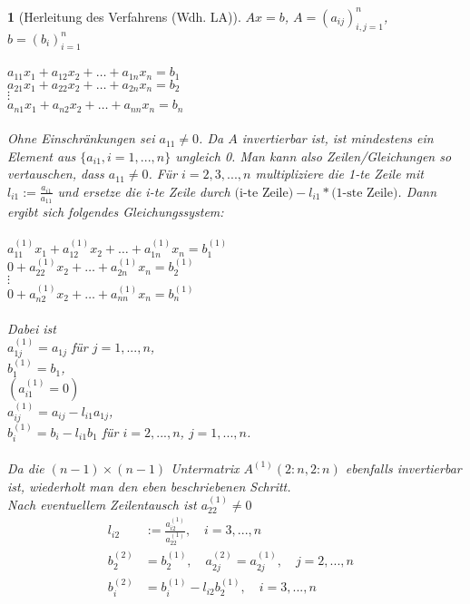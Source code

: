 \documentclass[12pt]{article}
\theoremstyle{break}
\newtheorem{nothing}[theorem]{}
\begin{document}
\begin{nothing}[Herleitung des Verfahrens (Wdh. LA)]
$Ax = b$, $A = (a_{ij})_{i,j = 1}^n$, $b = (b_i)_{i=1}^n$\\\\
%
$a_{11} x_1 + a_{12}x_2 + \dots + a_{1n}x_n = b_1$\\
$a_{21} x_1 + a_{22}x_2 + \dots + a_{2n}x_n = b_2$\\
$\vdots$ \\
$a_{n1} x_1 + a_{n2}x_2 + \dots + a_{nn}x_n = b_n$\\\\
%
Ohne Einschränkungen sei $a_{11} \neq 0 $. Da $A$ invertierbar ist, ist mindestens ein Element aus $\{a_{i1}, i=1,...,n\}$ ungleich 0. Man kann also Zeilen/Gleichungen so vertauschen, dass $a_{11} \neq 0$. Für $i=2,3,...,n$ multipliziere die 1-te Zeile mit $l_{i1} := \frac{a_{i1}}{a_{11}}$ und ersetze die i-te Zeile durch $\text{(i-te Zeile)} - l_{i1} * \text{(1-ste Zeile)}$. Dann ergibt sich folgendes Gleichungssystem: \\\\
%
$a_{11}^{(1)} x_1 + a_{12}^{(1)}x_2 + \dots + a_{1n}^{(1)}x_n = b_1^{(1)}$\\
$0 + a_{22}^{(1)}x_2 + \dots + a_{2n}^{(1)}x_n = b_2^{(1)}$\\
$\vdots$ \\
$0+ a_{n2}^{(1)}x_2 + \dots + a_{nn}^{(1)}x_n = b_n^{(1)}$\\\\
%
Dabei ist\\
$a_{1j}^{(1)} = a_{1j}$ für $j=1,...,n$, \\
$b_1^{(1)} = b_1$, \\
$(a_{i1}^{(1)} = 0)$\\
$a_{ij}^{(1)} = a_{ij} - l_{i1} a_{1j}$,\\
$b_i^{(1)} = b_i - l_{i1} b_1$ für $i=2,...,n$, $j=1,...,n$.\\\\
%
Da die $(n-1)\times (n-1)$ Untermatrix $A^{(1)} (2:n, 2:n)$ ebenfalls invertierbar ist, wiederholt man den eben beschriebenen Schritt.\\
Nach eventuellem Zeilentausch ist $a_{22}^{(1)} \neq 0$
%
\begin{align*}
l_{i2} &:= \frac{a_{i2}^{(1)}}{a_{22}^{(1)}}, \quad i=3,...,n &\\
b_2^{(2)} &= b_2^{(1)}, \quad a_{2j}^{(2)} = a_{2j}^{(1)}, \quad j=2,...,n &\\
b_i^{(2)} &= b_i^{(1)} - l_{i2} b_2^{(1)}, \quad i=3,...,n &\\

\end{align*}
\end{nothing}
\end{document}
